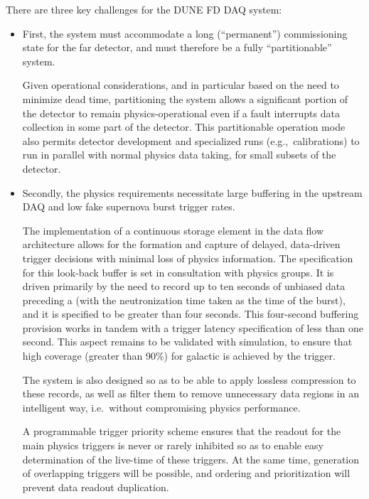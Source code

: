 There are three key challenges for the DUNE FD DAQ system: 
\begin{itemize}
\item First, the system must accommodate
a long (``permanent'') commissioning state for the far detector, and
must therefore be a fully ``partitionable'' system. 

Given operational considerations, and in particular based
on the need to minimize  dead time, partitioning the  system allows 
a significant portion of the detector to remain physics-operational
even if a fault interrupts data collection in
some part of the detector. 
This partitionable operation mode also
permits detector development and specialized runs (e.g.,~calibrations)
to run in parallel with normal physics data taking, for small subsets
of the detector.

\item Secondly, the   physics
requirements necessitate large buffering in the upstream DAQ and low fake
supernova burst trigger rates. 

The implementation of a continuous storage element in the data flow
architecture allows for the formation and capture of delayed, data-driven
trigger decisions with minimal loss of physics information. The
specification for this look-back buffer is set in consultation with
physics groups. It is driven primarily by the need to record up to ten
seconds of unbiased data preceding a  (with the
neutronization time taken as the time of the burst), and it is
specified to be greater than four seconds. This four-second
buffering provision works in tandem with a trigger latency
specification of less than one second. This aspect remains to be validated
with simulation, to ensure that high coverage (greater than 90\%) for galactic  is achieved by the  trigger.

The  system is also designed so as to be able to %
apply lossless compression to these records, as well as
filter them %
to remove unnecessary data regions
in an intelligent way, i.e.~without compromising physics performance.

A programmable trigger priority scheme ensures %
that the readout for the main physics triggers
is never or rarely inhibited so as %
to enable easy determination of the live-time of
these triggers. %
At the same time, generation
of overlapping triggers will be possible, %
and ordering and prioritization will %
prevent data readout duplication. 


\end{itemize}
